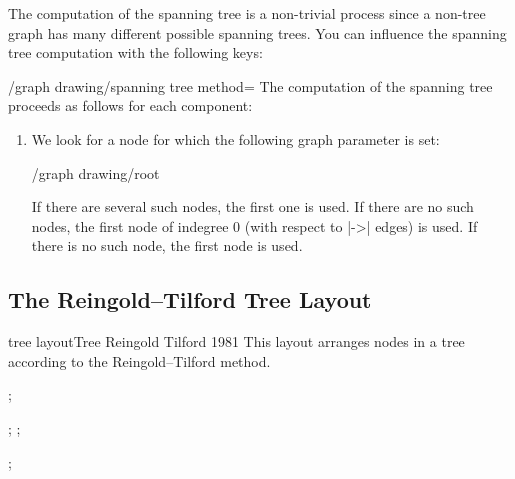 {The computation of the spanning tree is a non-trivial process since
a non-tree graph has many different possible spanning trees. You can
influence the spanning tree computation with the following keys:

\begin{key}{/graph drawing/spanning tree method=}
  The computation of the spanning tree proceeds as follows for each component:
  \begin{enumerate}
  \item We look for a node for which the following graph parameter is
    set:
    \begin{key}{/graph drawing/root}
    \end{key}
    If there are several such nodes, the first one is used. If there
    are no such nodes, the first node of indegree 0 (with respect to
    |->| edges) is used. If there is no such node, the first node is
    used. 
  \end{enumerate}
\end{key}




\subsection{The Reingold--Tilford Tree Layout}

\begin{gdalgorithm}{tree layout}{Tree Reingold Tilford 1981}
  This layout arranges nodes in a tree according to the
  Reingold--Tilford method.
\begin{codeexample}[]
\tikz [binary tree layout, sibling distance=7mm, level distance=10mm]
\graph [nodes={circle, inner sep=0pt, minimum size=2mm, fill}]{
  / -- { / -- / -- { / -- /, / -- { /, / }}, / -- / -- /[second] }
};
\end{codeexample}
\begin{codeexample}[]
\tikz {};\qquad
\tikz {};
\end{codeexample}
\begin{codeexample}[]
\tikz {};
\end{codeexample}
\end{gdalgorithm}

}
